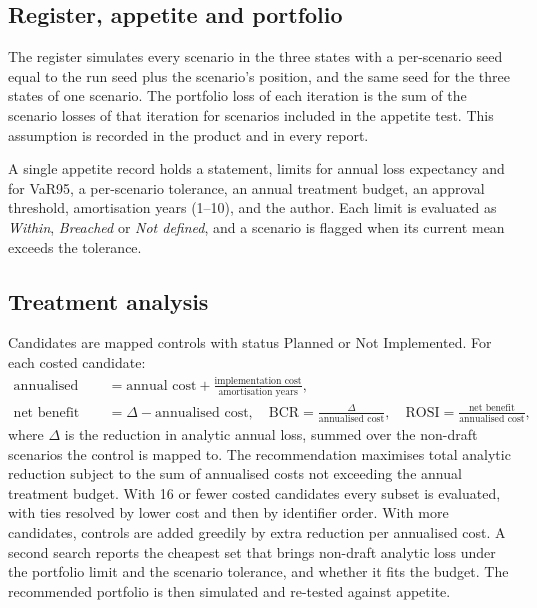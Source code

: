\documentclass[11pt,a4paper]{article}
\begin{document}
\subsection{Register, appetite and portfolio}
The register simulates every scenario in the three states with a per-scenario seed equal to the run seed plus the scenario's position, and the same seed for the three states of one scenario. The portfolio loss of each iteration is the sum of the scenario losses of that iteration for scenarios included in the appetite test. This assumption is recorded in the product and in every report.

A single appetite record holds a statement, limits for annual loss expectancy and for VaR95, a per-scenario tolerance, an annual treatment budget, an approval threshold, amortisation years (1--10), and the author. Each limit is evaluated as \emph{Within}, \emph{Breached} or \emph{Not defined}, and a scenario is flagged when its current mean exceeds the tolerance.

\subsection{Treatment analysis}
Candidates are mapped controls with status Planned or Not Implemented. For each costed candidate:
\begin{align}
\text{annualised cost}&=\text{annual cost}+\frac{\text{implementation cost}}{\text{amortisation years}},\\
\text{net benefit}&=\Delta-\text{annualised cost},\quad
\text{BCR}=\frac{\Delta}{\text{annualised cost}},\quad
\text{ROSI}=\frac{\text{net benefit}}{\text{annualised cost}},
\end{align}
where $\Delta$ is the reduction in analytic annual loss, summed over the non-draft scenarios the control is mapped to. The recommendation maximises total analytic reduction subject to the sum of annualised costs not exceeding the annual treatment budget. With 16 or fewer costed candidates every subset is evaluated, with ties resolved by lower cost and then by identifier order. With more candidates, controls are added greedily by extra reduction per annualised cost. A second search reports the cheapest set that brings non-draft analytic loss under the portfolio limit and the scenario tolerance, and whether it fits the budget. The recommended portfolio is then simulated and re-tested against appetite.
\end{document}
